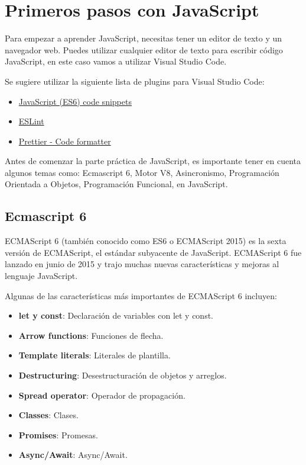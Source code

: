 \documentclass[
  a4paper,
  DIV=11,
  numbers=noendperiod,
  onepage,
  openany]{scrreprt}
\providecommand{\tightlist}{%
  \setlength{\itemsep}{0pt}\setlength{\parskip}{0pt}}\usepackage{longtable,booktabs,array}
\begin{document}
\chapter{Primeros pasos con
JavaScript}\label{primeros-pasos-con-javascript}

Para empezar a aprender JavaScript, necesitas tener un editor de texto y
un navegador web. Puedes utilizar cualquier editor de texto para
escribir código JavaScript, en este caso vamos a utilizar Visual Studio
Code.

Se sugiere utilizar la siguiente lista de plugins para Visual Studio
Code:

\begin{itemize}
\tightlist
\item
  \href{https://marketplace.visualstudio.com/items?itemName=xabikos.JavaScriptSnippets}{JavaScript
  (ES6) code snippets}
\item
  \href{https://marketplace.visualstudio.com/items?itemName=dbaeumer.vscode-eslint}{ESLint}
\item
  \href{https://marketplace.visualstudio.com/items?itemName=esbenp.prettier-vscode}{Prettier
  - Code formatter}
\end{itemize}

Antes de comenzar la parte práctica de JavaScript, es importante tener
en cuenta algunos temas como: Ecmascript 6, Motor V8, Asincronismo,
Programación Orientada a Objetos, Programación Funcional, en JavaScript.

\section{Ecmascript 6}\label{ecmascript-6}

ECMAScript 6 (también conocido como ES6 o ECMAScript 2015) es la sexta
versión de ECMAScript, el estándar subyacente de JavaScript. ECMAScript
6 fue lanzado en junio de 2015 y trajo muchas nuevas características y
mejoras al lenguaje JavaScript.

Algunas de las características más importantes de ECMAScript 6 incluyen:

\begin{itemize}
\tightlist
\item
  \textbf{let y const}: Declaración de variables con let y const.
\item
  \textbf{Arrow functions}: Funciones de flecha.
\item
  \textbf{Template literals}: Literales de plantilla.
\item
  \textbf{Destructuring}: Desestructuración de objetos y arreglos.
\item
  \textbf{Spread operator}: Operador de propagación.
\item
  \textbf{Classes}: Clases.
\item
  \textbf{Promises}: Promesas.
\item
  \textbf{Async/Await}: Async/Await.
\end{itemize}
\end{document}
